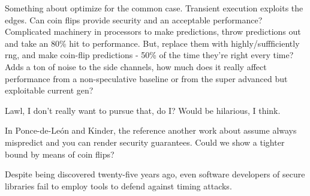 \documentclass[11pt,conference]{IEEEtran}
\begin{document}
Something about optimize for the common case.
Transient execution exploits the edges.
Can coin flips provide security and an acceptable performance?
Complicated machinery in processors to make predictions, throw predictions out and take an 80\% hit to performance.
But, replace them with highly/suffficiently rng, and make coin-flip predictions - 50\% of the time they're right every time?
Adds a ton of noise to the side channels, how much does it really affect performance from a non-speculative baseline or from the super advanced but exploitable current gen?

Lawl, I don't really want to pursue that, do I?
Would be hilarious, I think.

In Ponce-de-León and Kinder\cite{cats2022}, the reference another work about assume always mispredict and you can render security guarantees.
Could we show a tighter bound by means of coin flips?


Despite being discovered twenty-five years ago\cite{kocher96}, even software developers of secure libraries fail to employ tools to defend against timing attacks\cite{9833713}.




\end{document}
